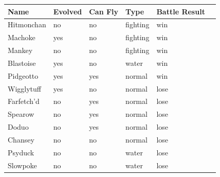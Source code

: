 \documentclass[11pt]{article}
\begin{document}
\begin{tabular}{|l|l|l|l|l|l|}
\hline
\textbf{Name} &  \textbf{Evolved} & \textbf{Can Fly} & \textbf{Type} & \textbf{Battle Result}\\
\hline 
Hitmonchan & no & no & fighting & win \\
\hline 
Machoke & yes & no & fighting & win \\
\hline
Mankey & no  & no & fighting & win \\
\hline 
Blastoise & yes  & no & water & win \\
\hline 
Pidgeotto & yes  & yes & normal & win \\
\hline 
Wigglytuff & yes & no & normal & lose \\
\hline 
Farfetch'd & no & yes & normal & lose \\
\hline
Spearow & no  & yes & normal & lose \\
\hline 
Doduo & no & yes & normal & lose \\
\hline 
Chansey & no & no & normal & lose \\
\hline 
Psyduck & no & no & water & lose \\
\hline
Slowpoke & no & no & water & lose \\
\hline 

\end{tabular}
\end{document}
